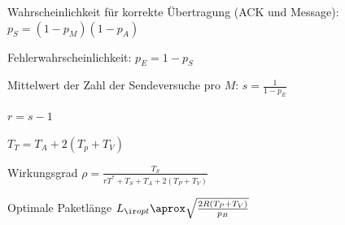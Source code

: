 \documentclass[fs, footer]{latex4ei}
\begin{document}
\begin{multicols*}{4}
Wahrscheinlichkeit für korrekte Übertragung (ACK und Message): $p_S = (1 - p_M) (1 - p_A)$

Fehlerwahrscheinlichkeit: $p_E= 1 - p_S$

Mittelwert der Zahl der Sendeversuche pro $M$: $s = \frac{1}{1 - p_E}$

$r = s - 1$

$T_T = T_A + 2 (T_p + T_V)$

Wirkungsgrad $\rho = \frac{T_S}{rT^* + T_S + T_A + 2 (T_P + T_V)}$


Optimale Paketlänge  $L_{\ir opt} \aprox \sqrt{\frac{2R(T_P + T_V)}{p_B}} $


\end{multicols*}

\end{document}
